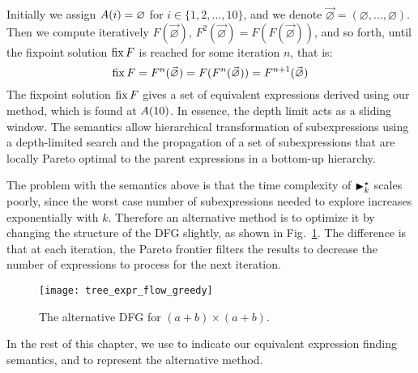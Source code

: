 Initially we assign $A({i}) = \varnothing$ for $i\in\{1,2,\ldots,10\}$,
and we denote $\vec\varnothing = (\varnothing, \ldots, \varnothing)$.
Then we compute iteratively $F(\vec\varnothing)$, $F^2(\vec\varnothing) =
F(F(\vec\varnothing))$, and so forth, until the fixpoint solution $\operatorname{\mathrm{fix}} F$ is
reached for some iteration $n$, that is:
\begin{equation}
    \operatorname{\mathrm{fix}} F = F^n(\vec\varnothing) =
    F(F^n(\vec\varnothing)) = F^{n + 1}(\vec\varnothing)
\end{equation}
The fixpoint solution $\operatorname{\mathrm{fix}} F$ gives a set of equivalent expressions derived
using our method, which is found at $A({10})$. In essence, the depth limit
acts as a sliding window.  The semantics allow hierarchical transformation of
subexpressions using a depth-limited search and the propagation of a set of
subexpressions that are locally Pareto optimal to the parent expressions in a
bottom-up hierarchy.

The problem with the semantics above is that the time complexity of
$\operatorname{\blacktriangleright}^\star_k$ scales poorly, since the worst case number of subexpressions
needed to explore increases exponentially with $k$. Therefore an alternative
method is to optimize it by changing the structure of the DFG slightly, as
shown in Fig.~\ref{fig:tree_expr_flow_greedy}. The difference is that at each
iteration, the Pareto frontier filters the results to decrease the number of
expressions to process for the next iteration.
\begin{figure}[ht]
    \centering
    \texttt{[image: tree\_expr\_flow\_greedy]}
    \caption{The alternative DFG for $(a + b) \times (a + b)$.
    }\label{fig:tree_expr_flow_greedy}
\end{figure}

In the rest of this chapter, we use \frontiertrace{} to indicate our equivalent
expression finding semantics, and \greedytrace{} to represent the alternative
method.
